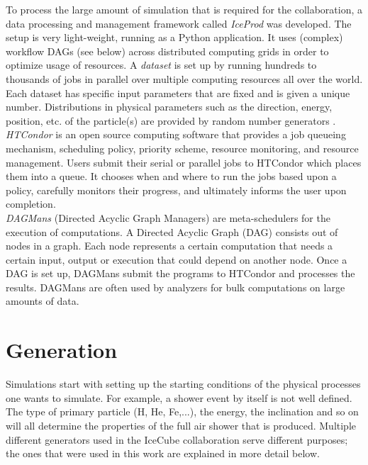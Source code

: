 \noindent To process the large amount of simulation that is required for the collaboration, a data processing and management framework called \textit{IceProd} was developed. The setup is very light-weight, running as a Python application. It uses (complex) workflow DAGs (see below) across distributed computing grids in order to optimize usage of resources. A \textit{dataset} is set up by running hundreds to thousands of jobs in parallel over multiple computing resources all over the world. Each dataset has specific input parameters that are fixed and is given a unique number. Distributions in physical parameters such as the direction, energy, position, etc. of the particle(s) are provided by random number generators \cite{1742-6596-664-6-062056}.\\

\noindent \textit{HTCondor} is an open source computing software that provides a job queueing mechanism, scheduling policy, priority scheme, resource monitoring, and resource management. Users submit their serial or parallel jobs to HTCondor which places them into a queue. It chooses when and where to run the jobs based upon a policy, carefully monitors their progress, and ultimately informs the user upon completion.\\

\noindent \textit{DAGMans} (Directed Acyclic Graph Managers) are meta-schedulers for the execution of computations. A Directed Acyclic Graph (DAG) consists out of nodes in a graph. Each node represents a certain computation that needs a certain input, output or execution that could depend on another node. Once a DAG is set up, DAGMans submit the programs to HTCondor and processes the results. DAGMans are often used by analyzers for bulk computations on large amounts of data.

\section{Generation}
Simulations start with setting up the starting conditions of the physical processes one wants to simulate. For example, a shower event by itself is not well defined. The type of primary particle (H, He, Fe,...), the energy, the inclination and so on will all determine the properties of the full air shower that is produced. Multiple different generators used in the IceCube collaboration serve different purposes; the ones that were used in this work are explained in more detail below.

